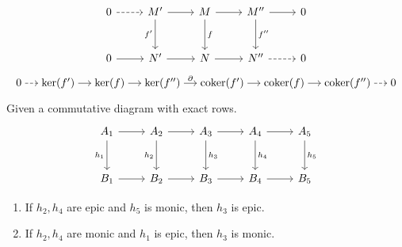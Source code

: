 \begin{lemma}
  \begin{equation*}
    \begin{tikzcd}[row sep=large]
      0 & M' & M & M'' & 0\\
      0 & N' & N & N'' & 0
      \arrow[from=1-1,dashed,]{1-2}[]{}
      \arrow[from=1-2,]{1-3}[]{}
      \arrow[from=1-3,]{1-4}[]{}
      \arrow[from=1-4,]{1-5}[]{}
      \arrow[from=2-1,]{2-2}[]{}
      \arrow[from=2-2,]{2-3}[]{}
      \arrow[from=2-3,]{2-4}[]{}
      \arrow[from=2-4,dashed,]{2-5}[]{}
      \arrow[from=1-2,]{2-2}[swap]{f'}
      \arrow[from=1-3,]{2-3}[]{f}
      \arrow[from=1-4,]{2-4}[]{f''}
    \end{tikzcd}
  \end{equation*}
  \begin{equation*}
    \begin{tikzcd}[sep=small, cramped]
      0 & \KER(f') & \KER(f) & \KER(f'') & \COKER(f') & \COKER(f) & \COKER(f'') & 0
      \arrow[from=1-1,dashed,]{1-2}[]{}
      \arrow[from=1-2,]{1-3}[]{}
      \arrow[from=1-3,]{1-4}[]{}
      \arrow[from=1-4,]{1-5}[]{\partial}
      \arrow[from=1-5,]{1-6}[]{}
      \arrow[from=1-6,]{1-7}[]{}
      \arrow[from=1-7,dashed,]{1-8}[]{}
    \end{tikzcd}
  \end{equation*}
\end{lemma}

\begin{lemma}
  Given a commutative diagram with exact rows.
  \begin{equation*}
    \begin{tikzcd}[row sep=large]
      A_1 & A_2 & A_3 & A_4 & A_5\\
      B_1 & B_2 & B_3 & B_4 & B_5
      \arrow[from=1-1,]{1-2}[]{}
      \arrow[from=1-2,]{1-3}[]{}
      \arrow[from=1-3,]{1-4}[]{}
      \arrow[from=1-4,]{1-5}[]{}
      \arrow[from=2-1,]{2-2}[]{}
      \arrow[from=2-2,]{2-3}[]{}
      \arrow[from=2-3,]{2-4}[]{}
      \arrow[from=2-4,]{2-5}[]{}
      \arrow[from=1-1,]{2-1}[swap]{h_1}
      \arrow[from=1-2,]{2-2}[swap]{h_2}
      \arrow[from=1-3,]{2-3}[]{h_3}
      \arrow[from=1-4,]{2-4}[]{h_4}
      \arrow[from=1-5,]{2-5}[]{h_5}
    \end{tikzcd}
  \end{equation*}
  \begin{enumerate}
    \item If $h_2, h_4$ are epic and $h_5$ is monic, then $h_3$ is epic.
    \item If $h_2, h_4$ are monic and $h_1$ is epic, then $h_3$ is monic.
  \end{enumerate}
\end{lemma}

